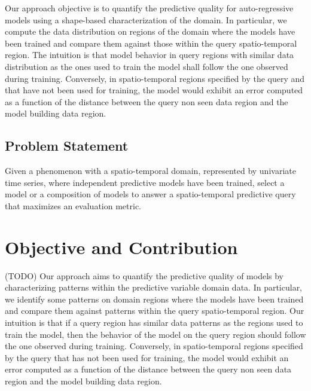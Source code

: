 Our approach objective is to quantify the predictive quality for auto-regressive models using a shape-based characterization of the domain. In particular, we compute the data distribution on regions of the domain where the models have been trained and compare them against those within the query spatio-temporal region. The intuition is that model behavior in query regions with similar data distribution as the ones used to train the model shall follow the one observed during training. Conversely, in spatio-temporal regions specified by the query and that have not been used for training, the model would exhibit an error computed as a function of the distance between the query non seen data region and the model building data region.

\subsection{Problem Statement}
\label{Sec:ProblemStatement}

Given a phenomenon with a spatio-temporal domain, represented by univariate time series, where independent predictive models have been trained, select a model or a composition of models to answer a spatio-temporal predictive query that maximizes an evaluation metric.

\section{Objective and Contribution}
\label{Sec:ObjectiveContribution}

(TODO) Our approach aims to quantify the predictive quality of models by characterizing patterns within the predictive variable domain data. In particular, we identify some patterns on domain regions where the models have been trained and compare them against patterns within the query spatio-temporal region. Our intuition is that if a query region has similar data patterns as the regions used to train the model, then the behavior of the model on the query region should follow the one observed during training.
Conversely, in spatio-temporal regions specified by the query that has not been used for training, the model would exhibit an error computed as a function of the distance between the query non seen data region and the model building data region.

